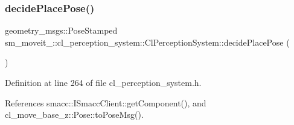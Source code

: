 \subsubsection{\texorpdfstring{decide\+Place\+Pose()}{decidePlacePose()}}
{\footnotesize\ttfamily geometry\+\_\+msgs\+::\+Pose\+Stamped sm\+\_\+moveit\+\_\+::cl\+\_\+perception\+\_\+system\+::\+Cl\+Perception\+System\+::decide\+Place\+Pose (\begin{DoxyParamCaption}{ }\end{DoxyParamCaption})\hspace{0.3cm}{\ttfamily [inline]}}



Definition at line 264 of file cl\+\_\+perception\+\_\+system.\+h.



References smacc\+::\+I\+Smacc\+Client\+::get\+Component(), and cl\+\_\+move\+\_\+base\+\_\+z\+::\+Pose\+::to\+Pose\+Msg().


